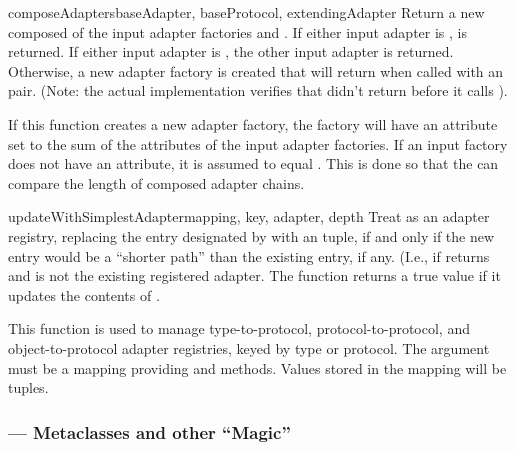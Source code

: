 \begin{verbatim%
}
\begin{verbatim%
}
\begin{verbatim%
}
\begin{verbatim%
}
\begin{funcdesc}{composeAdapters}{baseAdapter, baseProtocol, extendingAdapter}
Return a new  composed of the input adapter factories
 and .  If either input adapter is
,  is returned.  If
either input adapter is , the other input adapter
is returned.  Otherwise, a new adapter factory is created that will return
when called with an  pair.  (Note: the actual
implementation verifies that  didn't return 
before it calls ).

If this function creates a new adapter factory, the factory will have an
 attribute set to the sum of the
 attributes of the input adapter factories.  If an
input factory does not have an  attribute, it is
assumed to equal .  This is done so that the
 can compare the length of composed adapter chains.
\end{funcdesc}


\begin{funcdesc}{updateWithSimplestAdapter}{mapping, key, adapter, depth}
Treat  as an adapter registry, replacing the entry designated by
 with an  tuple, if and only if
the new entry would be a ``shorter path'' than the existing entry, if any.
(I.e., if 
returns  and  is not the existing registered adapter.
The function returns a true value if it updates the contents of .

This function is used to manage type-to-protocol, protocol-to-protocol, and
object-to-protocol adapter registries, keyed by type or protocol.  The
 argument must be a mapping providing 
and  methods.  Values stored in the mapping will be
 tuples.
\end{funcdesc}







\subsubsection{ --- Metaclasses and other ``Magic''}


\end{verbatim%
}
\end{verbatim%
}
\end{verbatim%
}
\end{verbatim%
}
